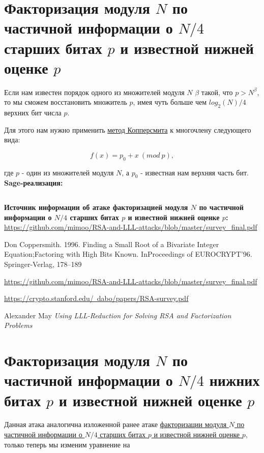 \documentclass[12pt,a4paper]{scrartcl}
\begin{document}
\section{Факторизация модуля $N$ по частичной информации о $N/4$ старших битах $p$ и известной нижней оценке $p$}

Если нам известен порядок одного из множителей модуля $N$ $\beta$ такой, что $p > N^\beta$, то мы сможем восстановить множитель $p$, имея чуть больше чем $log_2(N)/4$ верхних бит числа $p$.

Для этого нам нужно применить \href{https://yatb.kksctf.ru/}{метод Копперсмита} к многочлену следующего вида:

$$f(x) = p_0 + x\ (mod\ p),$$

где $p$ - один из множителей модуля $N$, а $p_0$ - известная нам верхняя часть бит.\\

\textbf{Sage-реализация:}

\inputminted[tabsize=4,obeytabs,fontsize=\footnotesize]{python3}{./RSA_scripts/upper_bit_p.sage}

\textbf{Источник информации об атаке факторизацией модуля $N$ по частичной информации о $N/4$ старших битах $p$ и известной нижней оценке $p$:}\\

\href{https://github.com/mimoo/RSA-and-LLL-attacks/blob/master/survey_final.pdf}{https://github.com/mimoo/RSA-and-LLL-attacks/blob/master/survey\_final.pdf}

Don Coppersmith. 1996. Finding a Small Root of a Bivariate Integer Equation;Factoring with High Bits Known. InProceedings of EUROCRYPT’96. Springer-Verlag, 178–189

\href{https://github.com/mimoo/RSA-and-LLL-attacks/blob/master/survey_final.pdf}{https://github.com/mimoo/RSA-and-LLL-attacks/blob/master/survey\_final.pdf}

\href{https://crypto.stanford.edu/~dabo/papers/RSA-survey.pdf}{https://crypto.stanford.edu/~dabo/papers/RSA-survey.pdf}

Alexander May \textit{Using LLL-Reduction for Solving RSA and Factorization Problems}

\section{Факторизация модуля $N$ по частичной информации о $N/4$ нижних битах $p$ и известной нижней оценке $p$}

Данная атака аналогична изложенной ранее атаке \href{https://yatb.kksctf.ru/}{факторизации модуля $N$ по частичной информации о $N/4$ старших битах $p$ и известной нижней оценке $p$}, только теперь мы изменим уравнение на 
\end{document}
